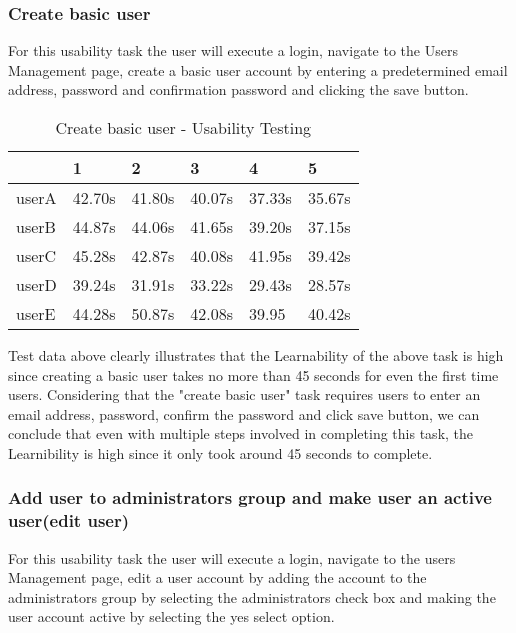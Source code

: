 \documentclass[12pt]{article}
\begin{document}
  
\subsubsection{Create basic user}
  For this usability task the user will execute a login, navigate to the Users Management page, create a basic user account by entering a predetermined email address, password and confirmation password and clicking the save button.
  
\begin{table}[H]
\centering
\caption{Create basic user - Usability Testing}
\begin{tabular}{|l|l|l|l|l|l|}
\hline
      & 1      & 2      & 3      & 4      & 5      \\ \hline
userA & 42.70s & 41.80s & 40.07s & 37.33s & 35.67s \\ \hline
userB & 44.87s & 44.06s & 41.65s & 39.20s & 37.15s \\ \hline
userC & 45.28s & 42.87s & 40.08s & 41.95s & 39.42s \\ \hline
userD & 39.24s & 31.91s & 33.22s & 29.43s & 28.57s \\ \hline
userE & 44.28s & 50.87s & 42.08s & 39.95  & 40.42s \\ \hline
\end{tabular}
\end{table}

Test data above clearly illustrates that the Learnability of the above task is high since creating a basic user takes no more than 45 seconds for even the first time users. Considering that the "create basic user" task requires users to enter an email address, password, confirm the password and click save button, we can conclude that even with multiple steps involved in completing this task, the Learnibility is high since it only took around 45 seconds to complete.
  
\subsubsection{Add user to administrators group and make user an active user(edit user)}
For this usability task the user will execute a login, navigate to the users Management page, edit a user account by adding the account to the administrators group by selecting the administrators check box and making the user account active by selecting the yes select option.
\end{document}

